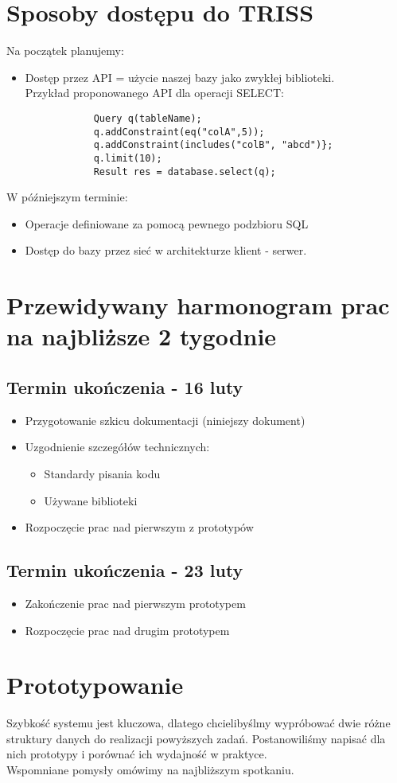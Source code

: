 \documentclass[11pt]{article}
\begin{document}
    \section{Sposoby dostępu do TRISS}
        Na początek planujemy:
        \begin{itemize}
            \item
                Dostęp przez API = użycie naszej bazy jako zwykłej biblioteki.\\
                Przykład proponowanego API dla operacji SELECT:
        \begin{lstlisting}
            Query q(tableName);
            q.addConstraint(eq("colA",5));
            q.addConstraint(includes("colB", "abcd")};
            q.limit(10);
            Result res = database.select(q);
        \end{lstlisting}
        \end{itemize}
        W późniejszym terminie:
        \begin{itemize}
            \item Operacje definiowane za pomocą pewnego podzbioru SQL
            \item Dostęp do bazy przez sieć w architekturze klient - serwer.
        \end{itemize}
    \section{Przewidywany harmonogram prac na najbliższe 2 tygodnie}
        \subsection{Termin ukończenia - 16 luty}
            \begin{itemize}
                \item Przygotowanie szkicu dokumentacji (niniejszy dokument)
                \item Uzgodnienie szczegółów technicznych:
                    \begin{itemize}
                        \item Standardy pisania kodu
                        \item Używane biblioteki
                    \end{itemize}
                \item Rozpoczęcie prac nad pierwszym z prototypów
            \end{itemize}
        \subsection{Termin ukończenia - 23 luty}
            \begin{itemize}
                \item Zakończenie prac nad pierwszym prototypem
                \item Rozpoczęcie prac nad drugim prototypem
            \end{itemize}
    \section{Prototypowanie}
        Szybkość systemu jest kluczowa, dlatego chcielibyślmy wypróbować dwie różne struktury danych do realizacji powyższych zadań. Postanowiliśmy napisać dla nich prototypy i porównać ich wydajność w praktyce.\\Wspomniane pomysły omówimy na najbliższym spotkaniu.
\end{document}
